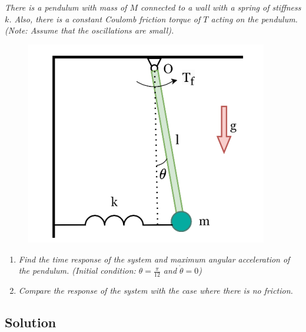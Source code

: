 \section{}
\textit{There is a pendulum with mass of $M$ connected to a wall with a spring of stiffness $k$. Also, there is a constant Coulomb friction torque of $T$ acting on the pendulum. (Note: Assume that the oscillations are small).}
\begin{figure}[H]
    \centering
    \includegraphics[width=0.5\linewidth]{Questions/Figures/Q5 Problem Diagram.png}
\end{figure}
\begin{enumerate}[label=(\alph*)]
    \item \textit{Find the time response of the system and maximum angular acceleration of the pendulum. (Initial condition: $\theta = \frac{\pi}{12}$ and $\dot{\theta} = 0$)}
    \item \textit{Compare the response of the system with the case where there is no friction.}
\end{enumerate}

\subsection*{Solution}

